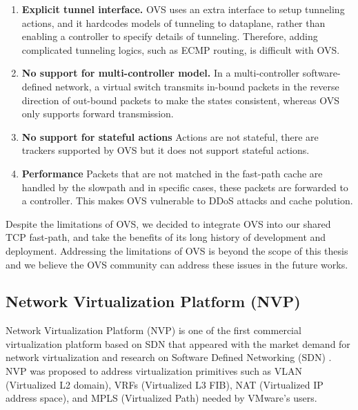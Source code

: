 \begin{enumerate}
    \item \textbf{Explicit tunnel interface.} OVS uses an extra interface to setup tunneling
    actions, and it hardcodes models of tunneling to dataplane, rather than enabling
    a controller to specify details of tunneling. Therefore, adding complicated tunneling 
    logics, such as ECMP routing, is difficult with OVS. 

    \item \textbf{No support for multi-controller model.} In a multi-controller 
    software-defined network, a virtual switch transmits in-bound packets in the reverse 
    direction of out-bound packets to make the states consistent, whereas OVS only supports forward transmission. 

    \item \textbf{No support for stateful actions} Actions are not stateful, there are 
    trackers supported by OVS but it does not support stateful actions. %

    \item \textbf{Performance} Packets that are not matched in the fast-path cache are 
    handled by the slowpath and in specific cases, these packets are forwarded to a 
    controller. This makes OVS vulnerable to DDoS attacks and cache polution.  %

\end{enumerate}

Despite the limitations of OVS, we decided to integrate OVS into our shared TCP fast-path,
and take the benefits of its long history of development and deployment. Addressing 
the limitations of OVS is beyond the scope of this thesis and we believe the OVS community can
address these issues in the future works. 

\subsection{Network Virtualization Platform (NVP)}
\label{nvp}
Network Virtualization Platform (NVP) is one of the first commercial virtualization 
platform based on SDN that appeared with the market demand for network virtualization
and research on Software Defined Networking (SDN) \cite{koponen2014network}. NVP was proposed 
to address virtualization primitives such as VLAN (Virtualized L2 domain), 
VRFs (Virtualized L3 FIB), NAT 
(Virtualized IP address space), and MPLS (Virtualized Path) needed by VMware's users.


